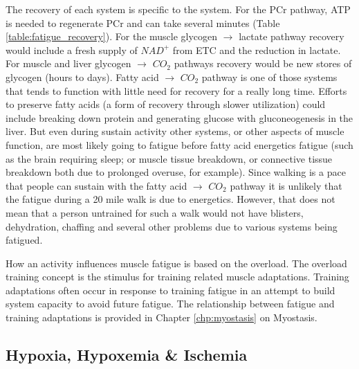 The recovery of each system is specific to the system. For the PCr pathway, ATP is needed to regenerate PCr and can take several minutes (Table \ref{table:fatigue_recovery}). For the muscle glycogen $\rightarrow$ lactate pathway recovery would include a fresh supply of $NAD^+$ from ETC and the reduction in lactate. For muscle and liver glycogen $\rightarrow$ $CO_2$ pathways recovery would be new stores of glycogen (hours to days). Fatty acid $\rightarrow$ $CO_2$ pathway is one of those systems that tends to function with little need for recovery for a really long time. Efforts to preserve fatty acids (a form of recovery through slower utilization) could include breaking down protein and generating glucose with gluconeogenesis in the liver. But even during sustain activity other systems, or other aspects of muscle function, are most likely going to fatigue before fatty acid energetics fatigue (such as the brain requiring sleep; or muscle tissue breakdown, or connective tissue breakdown both due to prolonged overuse, for example). Since walking is a pace that people can sustain with the fatty acid $\rightarrow$ $CO_2$ pathway it is unlikely that the fatigue during a 20 mile walk is due to energetics. However, that does not mean that a person untrained for such a walk would not have blisters, dehydration, chaffing and several other problems due to various systems being fatigued.

How an activity influences muscle fatigue is based on the overload. The overload training concept is the stimulus for training related muscle adaptations. Training adaptations often occur in response to training fatigue in an attempt to build system capacity to avoid future fatigue. The relationship between fatigue and training adaptations is provided in Chapter \ref{chp:myostasis} on Myostasis.

\subsection{Hypoxia, Hypoxemia \& Ischemia}

